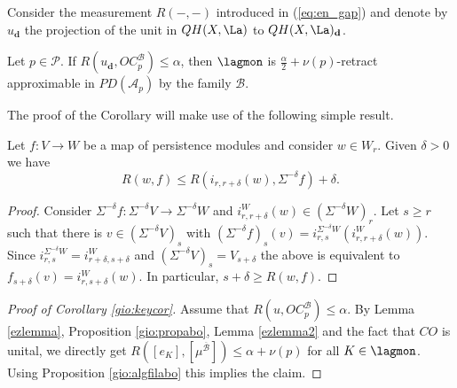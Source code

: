 \noindent Consider the measurement $R(-,-)$ introduced in (\ref{eq:en_gap}) 
and denote by $u_\mathbf{d}$ the projection of the unit in $QH(X,\La)$ to $QH(X,\La)_\mathbf{d}$.
\begin{cor}\label{gio:keycor}
	Let $p\in \mathcal{P}$. 
	If $R(u_\mathbf{d},OC^\mathcal{B}_p)\leq \alpha$, then $\lagmon$ is $\frac{\alpha}{2}+\nu(p)$-retract approximable in $PD(\mathcal{A}_p)$ by the family $\mathcal{B}$.
\end{cor}
The proof of the Corollary will make use of the following simple result.
\begin{lem}\label{ezlemma2}
	Let $f\colon V\to W$ be a map of persistence modules and consider $w\in W_r$. Given $\delta>0$ we have $$R(w,f)\leq R(i_{r,r+\delta}(w),\Sigma^{-\delta}f)+\delta.$$ 
\end{lem}
\begin{proof}
	Consider $\Sigma^{-\delta}f\colon \Sigma^{-\delta}V\to \Sigma^{-\delta}W$ and $i^W_{r,r+\delta}(w)\in (\Sigma^{-\delta}W)_r$. Let $s\geq r$ such that there is $v\in (\Sigma^{-\delta}V)_s$ with $(\Sigma^{-\delta}f)_s(v) = i^{\Sigma^{-\delta}W}_{r,s}(i^W_{r,r+\delta}(w))$. Since $i^{\Sigma^{-\delta}W}_{r,s} = i^{W}_{r+\delta,s+\delta}$ and $(\Sigma^{-\delta}V)_s=V_{s+\delta}$ the above is equivalent to $f_{s+\delta}(v) = i^W_{r,s+\delta}(w)$. In particular, $s+\delta\geq R(w,f)$.
\end{proof}
\begin{proof}[Proof of Corollary \ref{gio:keycor}]	
Assume that $R(u,OC^\mathcal{B}_p)\leq \alpha$. By Lemma \ref{ezlemma}, Proposition \ref{gio:propabo}, Lemma \ref{ezlemma2} and the fact that $CO$ is unital, we directly get $R([e_K],[\mu^{\overline{\mathcal{B}}}])\leq \alpha+\nu(p)$ for all $K\in \lagmon$. Using Proposition \ref{gio:algfilabo} this implies the claim.	
\end{proof}
